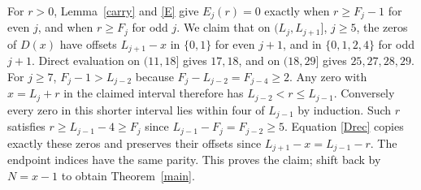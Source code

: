 \documentclass[10pt]{article}
\begin{document}
For $r>0$, Lemma~\ref{carry} and \eqref{E} give $E_j(r)=0$ exactly when $r\ge F_j-1$ for even $j$, and when $r\ge F_j$ for odd $j$. We claim that on $(L_j,L_{j+1}]$, $j\ge5$, the zeros of $D(x)$ have offsets $L_{j+1}-x$ in $\{0,1\}$ for even $j+1$, and in $\{0,1,2,4\}$ for odd $j+1$. Direct evaluation on $(11,18]$ gives $17,18$, and on $(18,29]$ gives $25,27,28,29$. For $j\ge7$, $F_j-1>L_{j-2}$ because $F_j-L_{j-2}=F_{j-4}\ge2$. Any zero with $x=L_j+r$ in the claimed interval therefore has $L_{j-2}<r\le L_{j-1}$. Conversely every zero in this shorter interval lies within four of $L_{j-1}$ by induction. Such $r$ satisfies $r\ge L_{j-1}-4\ge F_j$ since $L_{j-1}-F_j=F_{j-2}\ge5$. Equation \eqref{Drec} copies exactly these zeros and preserves their offsets since $L_{j+1}-x=L_{j-1}-r$. The endpoint indices have the same parity. This proves the claim; shift back by $N=x-1$ to obtain Theorem~\ref{main}.

\clearpage
\end{document}
